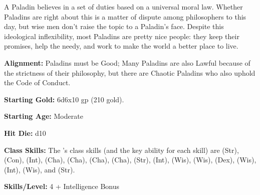 
A Paladin believes in a set of duties based on a universal moral law. Whether Paladins are right about this is a matter of dispute among philosophers to this day, but wise men don't raise the topic to a Paladin's face. Despite this ideological inflexibility, most Paladins are pretty nice people: they keep their promises, help the needy, and work to make the world a better place to live.

\textbf{Alignment:} Paladins must be Good; Many Paladins are also Lawful because of the strictness of their philosophy, but there are Chaotic Paladins who also uphold the Code of Conduct.

\textbf{Starting Gold:} 6d6x10 gp (210 gold).

\textbf{Starting Age:} Moderate

\textbf{Hit Die:} d10

\textbf{Class Skills:} The \currentclassname{}'s class skills (and the key ability for each skill) are  (Str),  (Con),  (Int),  (Cha),  (Cha),  (Cha),  (Cha),  (Str),  (Int),  (Wis),  (Wis),  (Dex),  (Wis),  (Int),  (Wis), and  (Str).

\textbf{Skills/Level:} 4 + Intelligence Bonus

\goodbab{}
\goodfor{}
\poorref{}
\goodwil{}

